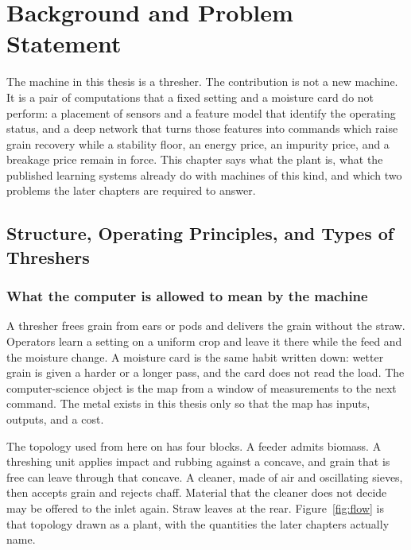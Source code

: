 \chapter{Background and Problem Statement}
\label{ch:back}

The machine in this thesis is a thresher. The contribution is not a new machine. It is a pair of computations that a fixed setting and a moisture card do not perform: a placement of sensors and a feature model that identify the operating status, and a deep network that turns those features into commands which raise grain recovery while a stability floor, an energy price, an impurity price, and a breakage price remain in force. This chapter says what the plant is, what the published learning systems already do with machines of this kind, and which two problems the later chapters are required to answer.

\section{Structure, Operating Principles, and Types of Threshers}
\label{sec:plant}

\subsection{What the computer is allowed to mean by the machine}

A thresher frees grain from ears or pods and delivers the grain without the straw. Operators learn a setting on a uniform crop and leave it there while the feed and the moisture change. A moisture card is the same habit written down: wetter grain is given a harder or a longer pass, and the card does not read the load. The computer-science object is the map from a window of measurements to the next command. The metal exists in this thesis only so that the map has inputs, outputs, and a cost.

The topology used from here on has four blocks. A feeder admits biomass. A threshing unit applies impact and rubbing against a concave, and grain that is free can leave through that concave. A cleaner, made of air and oscillating sieves, then accepts grain and rejects chaff. Material that the cleaner does not decide may be offered to the inlet again. Straw leaves at the rear. Figure~\ref{fig:flow} is that topology drawn as a plant, with the quantities the later chapters actually name.

